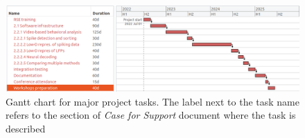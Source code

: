 \documentclass[a4paper,11point]{article}
\author{}
\date{}
\begin{document}
\begin{figure}[!t]
   \begin{center}
       \includegraphics[width=7in]{../costing/workPlan_coarse.png}

       \caption{Gantt chart for major project tasks. The label next to the task
       name refers to the section of \emph{Case for Support} document where the
       task is described}

     \label{fig:gnattChart}
   \end{center}
\end{figure}
\end{document}
